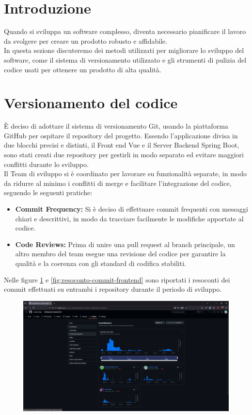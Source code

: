 \section{Introduzione}
Quando si sviluppa un software complesso, diventa necessario pianificare il lavoro da svolgere per creare un prodotto robusto e affidabile.\\
In questa sezione discuteremo dei metodi utilizzati per migliorare lo sviluppo del software, come il sistema di versionamento utilizzato e gli strumenti di pulizia del codice usati per ottenere un prodotto di alta qualità.\\
\section{Versionamento del codice}
È deciso di adottare il sistema di versionamento Git, usando la piattaforma GitHub per ospitare il repository del progetto. Essendo l'applicazione divisa in due blocchi precisi e distinti, il Front end Vue e il Server Backend Spring Boot, sono stati creati due repository per gestirli in modo separato ed evitare maggiori conflitti durante lo sviluppo.\\
Il Team di sviluppo si è coordinato per lavorare su funzionalità separate, in modo da ridurre al minimo i conflitti di merge e facilitare l'integrazione del codice, seguendo le seguenti pratiche:\\
\begin{itemize}
    \item \textbf{Commit Frequency:} Si è deciso di effettuare commit frequenti con messaggi chiari e descrittivi, in modo da tracciare facilmente le modifiche apportate al codice.
    \item \textbf{Code Reviews:} Prima di unire una pull request al branch principale, un altro membro del team esegue una revisione del codice per garantire la qualità e la coerenza con gli standard di codifica stabiliti.
\end{itemize}
\newpage
Nelle figure \ref{fig:resoconto-commit-backend} e \ref{fig:resoconto-commit-frontend} sono riportati i resoconti dei commit effettuati su entrambi i repository durante il periodo di sviluppo.
\begin{figure}[H]
	\centering
	\includegraphics[width=1\linewidth]{"Immagini/Resoconto Commit BE.png"}
	\caption[Resoconto Commit Backend]{}
	\label{fig:resoconto-commit-backend}
\end{figure}
